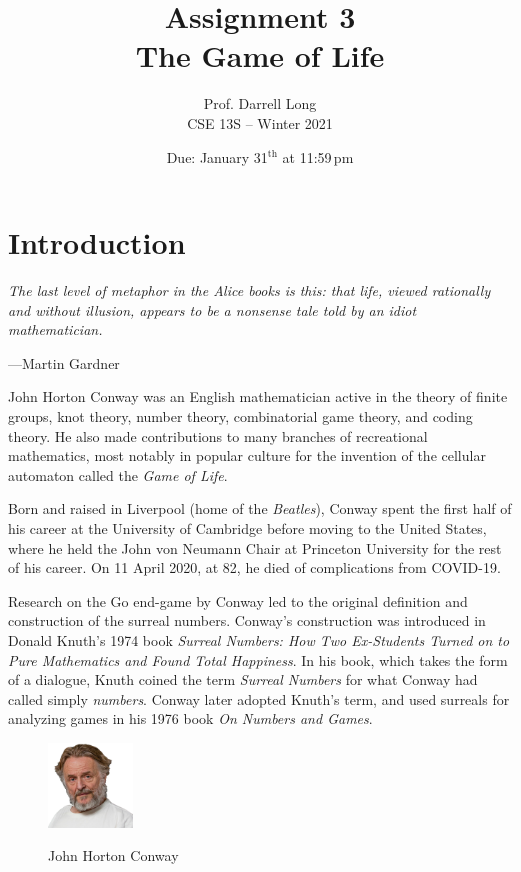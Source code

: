 \documentclass[11pt]{article}
\title{Assignment 3 \\ The Game of Life}
\author{Prof. Darrell Long \\ CSE 13S -- Winter 2021}
\date{Due: January 31$^\text{th}$ at 11:59\,pm}
\begin{document}
\maketitle

\section{Introduction}
\epigraph{\emph{The last level of metaphor in the Alice books is this: that life, viewed
rationally and without illusion, appears to be a nonsense tale told by an idiot mathematician.}}{
---Martin Gardner}

John Horton Conway was an English mathematician active in the theory
of finite groups, knot theory, number theory, combinatorial game
theory, and coding theory. He also made contributions to many
branches of recreational mathematics, most notably in popular
culture for the invention of the cellular automaton called the
\emph{Game of Life}.


Born and raised in Liverpool (home of the \emph{Beatles}), Conway spent the
first half of his career at the University of Cambridge before moving to the
United States, where he held the John von Neumann Chair at Princeton
University for the rest of his career. On 11 April 2020, at 82, he died of
complications from COVID-19.

Research on the Go end-game by Conway led to the original
definition and construction of the surreal numbers. Conway's
construction was introduced in Donald Knuth's 1974 book \emph{Surreal
Numbers: How Two Ex-Students Turned on to Pure Mathematics and Found
Total Happiness}. In his book, which takes the form of a dialogue,
Knuth coined the term \emph{Surreal Numbers} for what Conway had called
simply \emph{numbers}. Conway later adopted Knuth's term, and used
surreals for analyzing games in his 1976 book \emph{On Numbers and Games}.

\begin{figure}
\includegraphics[width=0.2\textwidth]{images/CK.png}
\centerline{\small John Horton Conway}
\end{figure}
\end{document}
